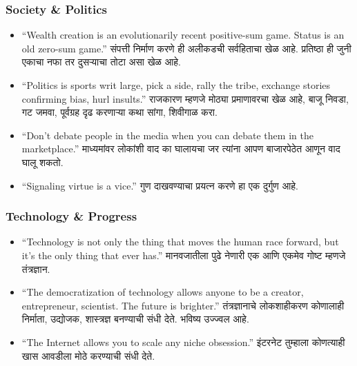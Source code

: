 \begin{frame}[fragile]\frametitle{Society \& Politics}
\begin{itemize}
    \item ``Wealth creation is an evolutionarily recent positive-sum game. Status is an old zero-sum game.'' संपत्ती निर्माण करणे ही अलीकडची सर्वहिताचा खेळ आहे. प्रतिष्ठा ही जुनी एकाचा नफा तर दुसऱ्याचा तोटा असा खेळ आहे.

    \item ``Politics is sports writ large, pick a side, rally the tribe, exchange stories confirming bias, hurl insults.'' राजकारण म्हणजे मोठ्या प्रमाणावरचा खेळ आहे, बाजू निवडा, गट जमवा, पूर्वग्रह दृढ करणाऱ्या कथा सांगा, शिवीगाळ करा.

    \item ``Don’t debate people in the media when you can debate them in the marketplace.'' माध्यमांवर लोकांशी वाद का घालायचा जर त्यांना आपण बाजारपेठेत आणून वाद घालू शकतो.

    \item ``Signaling virtue is a vice.'' गुण दाखवण्याचा प्रयत्न करणे हा एक दुर्गुण आहे.
\end{itemize}
\end{frame}


\begin{frame}[fragile]\frametitle{Technology \& Progress}
\begin{itemize}
    \item ``Technology is not only the thing that moves the human race forward, but it’s the only thing that ever has.'' मानवजातीला पुढे नेणारी एक आणि एकमेव गोष्ट म्हणजे तंत्रज्ञान.

    \item ``The democratization of technology allows anyone to be a creator, entrepreneur, scientist. The future is brighter.'' तंत्रज्ञानाचे लोकशाहीकरण कोणालाही निर्माता, उद्योजक, शास्त्रज्ञ बनण्याची संधी देते. भविष्य उज्ज्वल आहे.

    \item ``The Internet allows you to scale any niche obsession.'' इंटरनेट तुम्हाला कोणत्याही खास आवडीला मोठे करण्याची संधी देते.
\end{itemize}
\end{frame}

